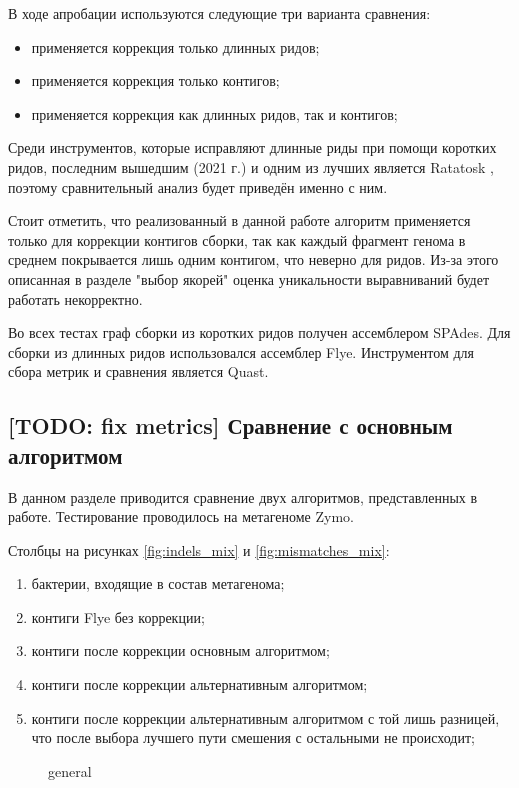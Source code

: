 \documentclass[14pt]{matmex-diploma-custom}
\begin{document}
В ходе апробации используются следующие три варианта сравнения:
\begin{itemize}
    \item применяется коррекция только длинных ридов;
    \item применяется коррекция только контигов;
    \item применяется коррекция как длинных ридов, так и контигов;
\end{itemize}

Среди инструментов, которые исправляют длинные риды при помощи коротких ридов, последним вышедшим (2021 г.) и одним из лучших является Ratatosk \cite{art:holley2021ratatosk, art:zhang2020comprehensive, art:fu2019comparative}, поэтому сравнительный анализ будет приведён именно с ним.

Стоит отметить, что реализованный в данной работе алгоритм применяется только для коррекции контигов сборки, так как каждый фрагмент генома в среднем покрывается лишь одним контигом, что неверно для ридов. Из-за этого описанная в разделе "выбор якорей" оценка уникальности выравниваний будет работать некорректно.

Во всех тестах граф сборки из коротких ридов получен ассемблером SPAdes. Для сборки из длинных ридов использовался ассемблер Flye. Инструментом для сбора метрик и сравнения является Quast.

\subsection{[TODO: fix metrics] Сравнение с основным алгоритмом }
В данном разделе приводится сравнение двух алгоритмов, представленных в работе. Тестирование проводилось на метагеноме Zymo.

Столбцы на рисунках \ref{fig:indels_mix} и \ref{fig:mismatches_mix}:
\begin{enumerate}
    \item бактерии, входящие в состав метагенома;
    \item контиги Flye без коррекции;
    \item контиги после коррекции основным алгоритмом;
    \item контиги после коррекции альтернативным алгоритмом;
    \item контиги после коррекции альтернативным алгоритмом с той лишь разницей, что после выбора лучшего пути смешения с остальными не происходит;
\end{enumerate}

\begin{figure}[h]
    \centering
    
    \caption{general}
    \label{fig:general_mix}
\end{figure}
\end{document}
